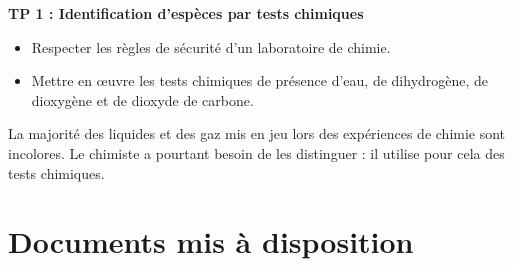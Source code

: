 
\renewcommand{\thesubsection}{\textcolor{red}{\Roman{section}.\arabic{subsection}}}
\renewcommand{\thesubsubsection}{\textcolor{red}{\Roman{section}.\arabic{subsection}.\alph{subsubsection}}}

\setcounter{section}{0}
\sndEnTeteTPUn

\begin{center}
\begin{mdframed}[style=titr, leftmargin=60pt, rightmargin=60pt, innertopmargin=7pt, innerbottommargin=7pt, innerrightmargin=8pt, innerleftmargin=8pt]

\begin{center}
\large{\textbf{TP 1 : Identification d'espèces par tests chimiques}}
\end{center}

\end{mdframed}
\end{center}



\begin{tcolorbox}[colback=blue!5!white,colframe=blue!75!black,title=Objectifs de la séance :]
\begin{itemize}
    \item Respecter les règles de sécurité d’un laboratoire de chimie.
    \item Mettre en œuvre les tests chimiques de présence d’eau, de dihydrogène, de dioxygène et de dioxyde de carbone.

\end{itemize}
\end{tcolorbox}

\begin{tcolorbox}[colback=orange!5!white,colframe=orange!75!black,title= Scénario:]
La majorité des liquides et des gaz mis en jeu lors des expériences de chimie sont incolores. Le chimiste a pourtant besoin de les distinguer : il utilise pour cela des tests chimiques.
\end{tcolorbox}

\section*{Documents mis à disposition}

